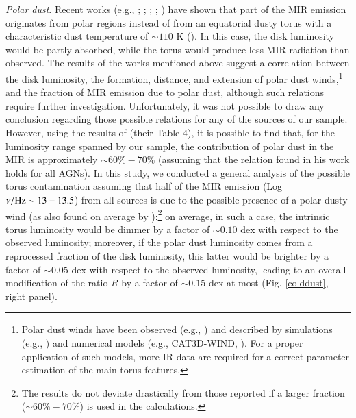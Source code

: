 \documentclass[]{aa}
\begin{document}
\textit{Polar dust}. Recent works (e.g., \citealt{Asmus16}; \citealt{Lopez}; \citealt{Left}; \citealt{Lyu}; \citealt{Asmus19}) have shown that part of the MIR emission originates from polar regions instead of from an equatorial dusty torus with a characteristic dust temperature of $\sim 110$ K (\citealt{Lyu}). In this case, the disk luminosity would be partly absorbed, while the torus would produce less MIR radiation than observed. The results of the works mentioned above suggest a correlation between the disk luminosity, the formation, distance, and extension of polar dust winds,\footnote{Polar dust winds have been observed (e.g., \citealt{Asmus19}) and described by simulations (e.g., \citealt{Vena}) and numerical models (e.g., CAT3D-WIND, \citealt{HonKish17}). For a proper application of such models, more IR data are required for a correct parameter estimation of the main torus features.} and the fraction of MIR emission due to polar dust, although such relations require further investigation. Unfortunately, it was not possible to draw any conclusion regarding those possible relations for any of the sources of our sample. However, using the results of \citet{Asmus19} (their Table 4), it is possible to find that, for the luminosity range spanned by our sample, the contribution of polar dust in the MIR is approximately $\sim 60\% - 70 \%$ (assuming that the relation found in his work holds for all AGNs). In this study, we conducted a general analysis of the possible torus contamination assuming that half of the MIR emission (Log $\nu / {\rm Hz} \sim 13 - 13.5$) from all sources is due to the possible presence of a polar dusty wind (as also found on average by \citealt{Asmus16}):\footnote{The results do not deviate drastically from those reported if a larger fraction ($\sim 60\% - 70 \%$) is used in the calculations.} on average, in such a case, the intrinsic torus luminosity would be dimmer by a factor of $\sim 0.10$ dex with respect to the observed luminosity; moreover, if the polar dust luminosity comes from a reprocessed fraction of the disk luminosity, this latter would be brighter by a factor of $\sim 0.05$ dex with respect to the observed luminosity, leading to an overall modification of the ratio $R$ by a factor of $\sim 0.15$ dex at most (Fig. \ref{colddust}, right panel).\\
\end{document}
